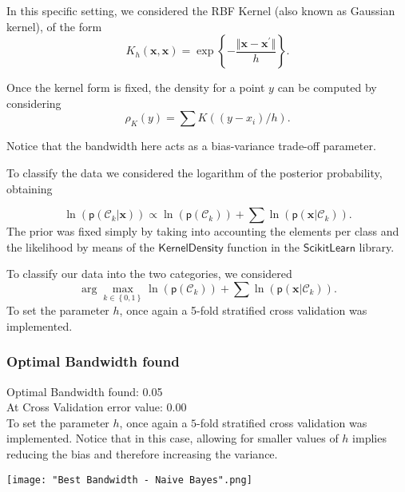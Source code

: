 \documentclass[a4paper]{article}
\begin{document}
In this specific setting, we considered the RBF Kernel (also known
as Gaussian kernel), of the form 
\begin{equation}
K_{h}\left(\mathbf{x},\mathbf{x}\right)=\exp\left\{ -\frac{\Vert\mathbf{x}-\mathbf{x^{\prime}}\Vert}{h}\right\} .\label{eq:-16}
\end{equation}

Once the kernel form is fixed, the density for a point $y$ can be
computed by considering 
\[
\rho_{K}\left(y\right)=\sum K\left(\left(y-x_{i}\right)/h\right).
\]

Notice that the bandwidth here acts as a bias-variance trade-off parameter.

To classify the data we considered the logarithm of the posterior
probability, obtaining

\begin{equation}
\ln\left(\mathsf{p}\left(\mathcal{C}_{k}|\mathbf{x}\right)\right)\propto\ln\left(\mathsf{p}\left(\mathcal{C}_{k}\right)\right)+\sum\ln\left(\mathsf{p}\left(\mathbf{x}|\mathcal{C}_{k}\right)\right).\label{eq:-17}
\end{equation}
The prior was fixed simply by taking into accounting the elements
per class and the likelihood by means of the $\mathsf{KernelDensity}$
function in the $\mathsf{ScikitLearn}$ library.

To classify our data into the two categories, we considered 
\begin{equation}
\arg\underset{k\in\left\{ 0,1\right\} }{\max}\ln\left(\mathsf{p}\left(\mathcal{C}_{k}\right)\right)+\sum\ln\left(\mathsf{p}\left(\mathbf{x}|\mathcal{C}_{k}\right)\right).\label{eq:-18}
\end{equation}
To set the parameter $h$, once again a 5-fold stratified cross validation
was implemented.

\subsubsection{Optimal Bandwidth found}


Optimal Bandwidth found: 0.05\\
At Cross Validation error value: 0.00\\

To set the parameter $h$, once again a $5$-fold stratified cross validation was implemented.
Notice that in this case, allowing for smaller values of $h$ implies reducing the bias and therefore increasing the variance.

\texttt{[image: "Best Bandwidth - Naive Bayes".png]}
\end{document}
